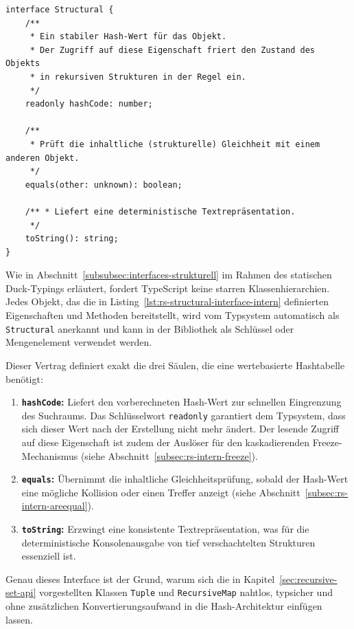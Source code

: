 \begin{listing}[ht]
    \caption{Der Vertrag für komplexe Mengenelemente}
    \label{lst:rs-structural-interface-intern}
    \begin{verbatim}
interface Structural {
    /**
     * Ein stabiler Hash-Wert für das Objekt. 
     * Der Zugriff auf diese Eigenschaft friert den Zustand des Objekts 
     * in rekursiven Strukturen in der Regel ein.
     */
    readonly hashCode: number;

    /**
     * Prüft die inhaltliche (strukturelle) Gleichheit mit einem anderen Objekt.
     */
    equals(other: unknown): boolean;

    /** * Liefert eine deterministische Textrepräsentation.
     */
    toString(): string;
}
    \end{verbatim}
\end{listing}

Wie in Abschnitt~\ref{subsubsec:interfaces-strukturell} im Rahmen des statischen Duck-Typings erläutert, fordert TypeScript keine starren Klassenhierarchien. Jedes Objekt, das die in Listing~\ref{lst:rs-structural-interface-intern} definierten Eigenschaften und Methoden bereitstellt, wird vom Typsystem automatisch als \texttt{Structural} anerkannt und kann in der Bibliothek als Schlüssel oder Mengenelement verwendet werden.

Dieser Vertrag definiert exakt die drei Säulen, die eine wertebasierte Hashtabelle benötigt:
\begin{enumerate}
    \item \textbf{\texttt{hashCode}:} Liefert den vorberechneten Hash-Wert zur schnellen Eingrenzung des Suchraums. Das Schlüsselwort \texttt{readonly} garantiert dem Typsystem, dass sich dieser Wert nach der Erstellung nicht mehr ändert. Der lesende Zugriff auf diese Eigenschaft ist zudem der Auslöser für den kaskadierenden Freeze-Mechanismus (siehe Abschnitt~\ref{subsec:rs-intern-freeze}).
    \item \textbf{\texttt{equals}:} Übernimmt die inhaltliche Gleichheitsprüfung, sobald der Hash-Wert eine mögliche Kollision oder einen Treffer anzeigt (siehe Abschnitt~\ref{subsec:rs-intern-areequal}).
    \item \textbf{\texttt{toString}:} Erzwingt eine konsistente Textrepräsentation, was für die deterministische Konsolenausgabe von tief verschachtelten Strukturen essenziell ist.
\end{enumerate}

Genau dieses Interface ist der Grund, warum sich die in Kapitel~\ref{sec:recursive-set-api} vorgestellten Klassen \texttt{Tuple} und \texttt{RecursiveMap} nahtlos, typsicher und ohne zusätzlichen Konvertierungsaufwand in die Hash-Architektur einfügen lassen.


